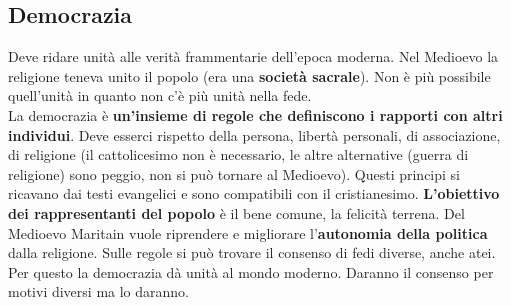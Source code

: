 \subsection{Democrazia}
Deve ridare unità alle verità frammentarie dell'epoca moderna. Nel Medioevo la religione teneva unito
il popolo (era una \textbf{società sacrale}). Non è più possibile quell'unità in quanto non c'è più
unità nella fede.\\
La democrazia è \textbf{un'insieme di regole che definiscono i rapporti con altri individui}. Deve
esserci rispetto della persona, libertà personali, di associazione, di religione (il cattolicesimo
non è necessario, le altre alternative (guerra di religione) sono peggio, non si può tornare al
Medioevo). Questi principi si ricavano dai testi evangelici e sono compatibili con il cristianesimo.
\textbf{L'obiettivo dei rappresentanti del popolo} è il bene comune, la felicità terrena. Del 
Medioevo Maritain vuole riprendere e migliorare l'\textbf{autonomia della politica} dalla religione.
Sulle regole si può trovare il consenso di fedi diverse, anche atei. Per questo la democrazia dà
unità al mondo moderno. Daranno il consenso per motivi diversi ma lo daranno.
